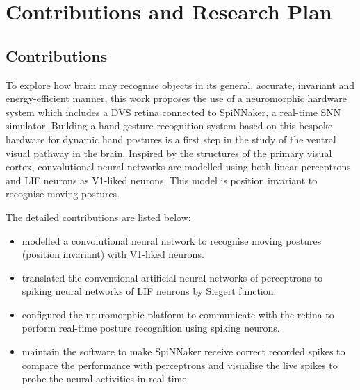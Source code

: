\chapter{Contributions and Research Plan}
\label{cha:plan}
\section{Contributions}
To explore how brain may recognise objects in its general, accurate, invariant and energy-efficient manner, this work proposes the use of a neuromorphic hardware system which includes a DVS retina connected to SpiNNaker, a real-time SNN simulator.
Building a hand gesture recognition system based on this bespoke hardware for dynamic hand postures is a first step in the study of the ventral visual pathway in the brain.
Inspired by the structures of the primary visual cortex, convolutional neural networks are modelled using both linear perceptrons and LIF neurons as V1-liked neurons.
This model is position invariant to recognise moving postures.


The detailed contributions are listed below:
\begin{itemize}
	\item modelled a convolutional neural network to recognise moving postures (position invariant) with V1-liked neurons.
	\item translated the conventional artificial neural networks of perceptrons to spiking neural networks of LIF neurons by Siegert function.
	\item configured the neuromorphic platform to communicate with the retina to perform real-time posture recognition using spiking neurons.
	\item maintain the software to make SpiNNaker receive correct recorded spikes to compare the performance with perceptrons and visualise the live spikes to probe the neural activities in real time.
\end{itemize}
	
